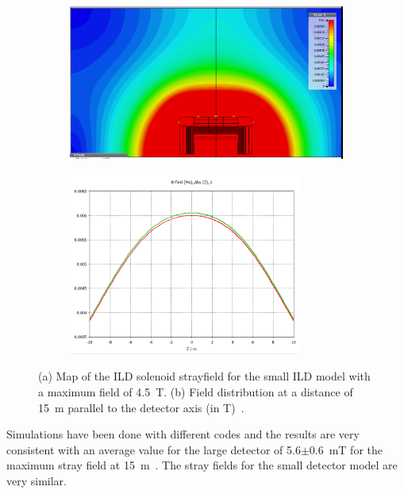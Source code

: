 \begin{figure}[h!]
\begin{center}
\begin{subfigure}{0.75\hsize} \includegraphics[width=\textwidth]{Integration/fig/strayfield_small_4_5.png}
\caption{ \label{ild:fig:magnet_small_stray_map}}
 \end{subfigure}
\hspace{0.03\textwidth}
\begin{subfigure}{0.75\hsize} \includegraphics[width=\textwidth, height =6cm]{Integration/fig/strayfield_small_4_5_plot.png}
\caption{  \label{ild:fig:magnet_small_stray_field}}
 \end{subfigure}
\end{center}
\caption{(a) Map of the ILD solenoid strayfield for the small ILD model with a maximum field of 4.5~T. (b) Field distribution at a distance of 15~m parallel to the detector axis (in T)~\cite{ild:bib:Magnet_Simulations}.}
\label{ILD:fig:magnet_small_stray}
\end{figure}

Simulations have been done with different codes and the results are very consistent with an average value for the large detector of 5.6$\pm$0.6~mT for the maximum stray field at 15~m~\cite{ild:bib:Magnet_Simulations}. The stray fields for the small detector model are very similar. 

